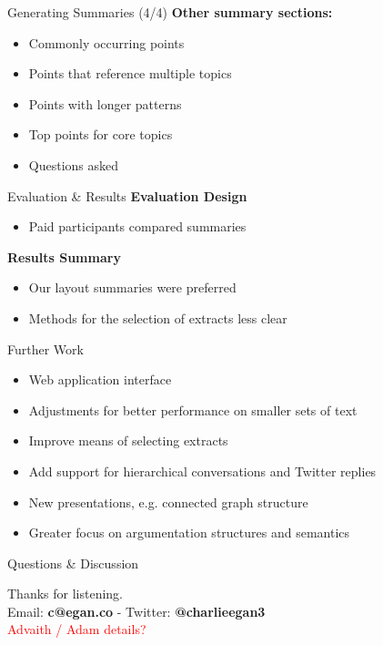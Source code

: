 \documentclass{beamer}
\begin{document}
  \begin{frame}{Generating Summaries (4/4)}
    \textbf{Other summary sections:}\\
    \begin{itemize}
      \item{Commonly occurring points}
      \item{Points that reference multiple topics}
      \item{Points with longer patterns}
      \item{Top points for core topics}
      \item{Questions asked}
    \end{itemize}
  \end{frame}

  \begin{frame}{Evaluation \& Results}
    \textbf{Evaluation Design}\\
    \begin{itemize}
      \item{Paid participants compared summaries}
    \end{itemize}
    \textbf{Results Summary}\\
    \begin{itemize}
      \item{Our layout summaries were preferred}
      \item{Methods for the selection of extracts less clear}
    \end{itemize}
  \end{frame}

  \begin{frame}{Further Work}
    \begin{itemize}
      \item{Web application interface}
      \item{Adjustments for better performance on smaller sets of text}
      \item{Improve means of selecting extracts}
      \item{Add support for hierarchical conversations and Twitter replies}
      \item{New presentations, e.g. connected graph structure}
      \item{Greater focus on argumentation structures and semantics}
    \end{itemize}
  \end{frame}

  \begin{frame}{Questions \& Discussion}
    \begin{center}
      Thanks for listening.\\
      Email: \textbf{c@egan.co} - Twitter: \textbf{@charlieegan3} \\
      \textcolor{red}{Advaith / Adam details?}
    \end{center}
  \end{frame}
\end{document}
